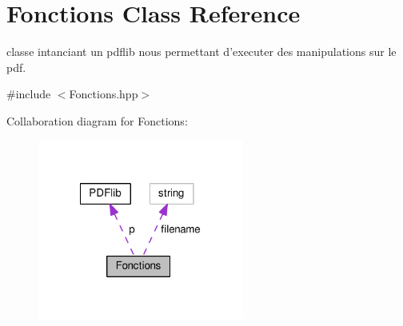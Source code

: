 \hypertarget{classFonctions}{\section{Fonctions Class Reference}
\label{classFonctions}
}


classe intanciant un pdflib nous permettant d'executer des manipulations sur le pdf.  




{\ttfamily \#include $<$Fonctions.\+hpp$>$}



Collaboration diagram for Fonctions\+:\nopagebreak
\begin{figure}[H]
\begin{center}
\leavevmode
\includegraphics[width=192pt]{classFonctions__coll__graph}
\end{center}
\end{figure}
